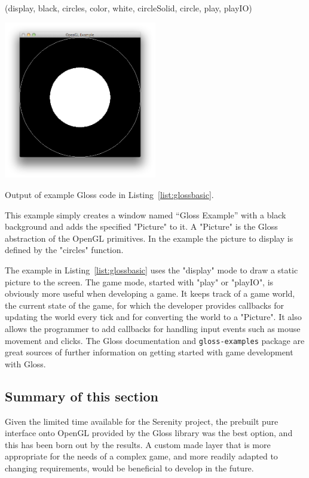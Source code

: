 \functions(display, black, circles, color, white, circleSolid, circle, play, playIO)
\begin{marginfigure}
	\hspace{-2em}\includegraphics[width=18em]{res/opengl/openglbasic.png}
	\caption[Output of example Gloss code in Listing~\ref{list:glossbasic}]{Output of example Gloss code in Listing~\ref{list:glossbasic}.}
	\label{fig:glossbasicout}
\end{marginfigure}
\vspace{-1em}
\noindent
This example simply creates a window named ``Gloss Example'' with a black background and adds the specified "Picture" to it. A "Picture" is the Gloss abstraction of the OpenGL primitives. In the example the picture to display is defined by the "circles" function.

The example in Listing~\ref{list:glossbasic} uses the "display" mode to draw a static picture to the screen. The game mode, started with "play" or "playIO", is obviously more useful when developing a game. It keeps track of a game world, the current state of the game, for which the developer provides callbacks for updating the world every tick and for converting the world to a "Picture". It also allows the programmer to add callbacks for handling input events such as mouse movement and clicks. The Gloss documentation and \texttt{gloss-examples} package are great sources of further information on getting started with game development with Gloss.

\subsection{Summary of this section} 
Given the limited time available for the Serenity project, the prebuilt pure interface onto OpenGL provided by the Gloss library was the best option, and this has been born out by the results. A custom made layer that is more appropriate for the needs of a complex game, and more readily adapted to changing requirements, would be beneficial to develop in the future.
